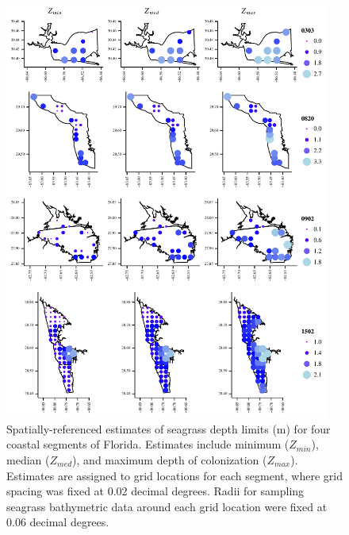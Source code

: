 \documentclass[letterpaper,12pt,oneside]{article}\usepackage[]{graphicx}\usepackage[]{color}
\begin{document}
\begin{figure}
\centering
\includegraphics[width = 0.95\textwidth]{figs/all_ests.pdf}
\caption{Spatially-referenced estimates of seagrass depth limits (m) for four coastal segments of Florida.  Estimates include minimum ($Z_{min}$), median ($Z_{med}$), and maximum depth of colonization ($Z_{max}$).  Estimates are assigned to grid locations for each segment, where grid spacing was fixed at 0.02 decimal degrees.  Radii for sampling seagrass bathymetric data around each grid location were fixed at 0.06 decimal degrees.}
\label{fig:all_ests}
\end{figure}

\end{document}
